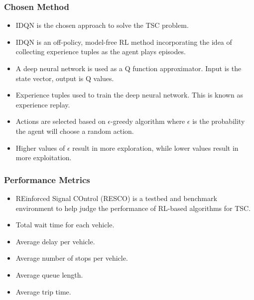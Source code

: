 \documentclass[compress,12pt]{beamer}
\begin{document}
\begin{frame}[bg=arguelles.png]
      \frametitle{Chosen Method}
      \begin{itemize}
      \item IDQN is the chosen approach to solve the TSC problem.
      \item IDQN is an off-policy, model-free RL method incorporating the idea of collecting experience tuples as the agent plays episodes.
      \item A deep neural network is used as a Q function approximator. Input is the state vector, output is Q values.
      \item Experience tuples used to train the deep neural network. This is known as experience replay.
      \item Actions are selected based on \(\epsilon\)-greedy algorithm where \(\epsilon\) is the probability the agent will choose a random action.
      \item Higher values of \(\epsilon\) result in more exploration, while lower values result in more exploitation.
      \end{itemize}
\end{frame}

\begin{frame}[bg=arguelles.png]
      \frametitle{Performance Metrics}
      \begin{itemize}
      \item REinforced Signal COntrol (RESCO) is a testbed and benchmark environment to help judge the performance of RL-based algorithms for TSC.
      \item Total wait time for each vehicle.
      \item Average delay per vehicle.
      \item Average number of stops per vehicle.
      \item Average queue length.
      \item Average trip time.
      \end{itemize}
\end{frame}

\end{document}
